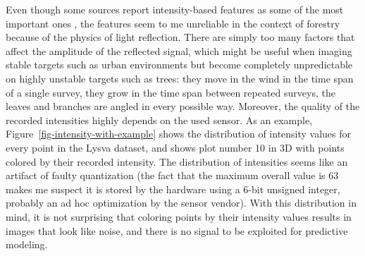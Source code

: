 Even though some sources report intensity-based features as some of the most important ones \cite{shiImportantLiDARMetrics2018}, the features seem to me unreliable in the context of forestry because of the physics of light reflection.
There are simply too many factors that affect the amplitude of the reflected signal, which might be useful when imaging stable targets such as urban environments but become completely unpredictable on highly unstable targets such as trees: they move in the wind in the time span of a single survey, they grow in the time span between repeated surveys, the leaves and branches are angled in every possible way.
Moreover, the quality of the recorded intensities highly depends on the used sensor.
As an example, Figure~\ref{fig-intensity-with-example} shows the distribution of intensity values for every point in the Lysva dataset, and shows plot number 10 in 3D with points colored by their recorded intensity.
The distribution of intensities seems like an artifact of faulty quantization (the fact that the maximum overall value is 63 makes me suspect it is stored by the hardware using a 6-bit unsigned integer, probably an ad hoc optimization by the sensor vendor).
With this distribution in mind, it is not surprising that coloring points by their intensity values results in images that look like noise, and there is no signal to be exploited for predictive modeling.

